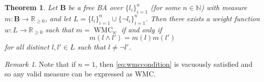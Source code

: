 \documentclass{article}
\newtheorem{theorem}{Theorem}
\theoremstyle{definition}
\theoremstyle{remark}
\newtheorem*{remark}{Remark}
\DeclareMathOperator{\WMC}{WMC}
\begin{document}
\begin{theorem}
  Let $\mathbf{B}$ be a free BA over $\{ l_i \}_{i=1}^n$ (for some $n \in
  \mathbb{N}$) with measure $m\colon \mathbf{B} \to \mathbb{R}_{\ge 0}$, and let
  $L = \{ l_i \}_{i = 1}^n \cup \{ \neg l_i \}_{i = 1}^n$. Then there exists a
  weight function $w\colon L \to \mathbb{R}_{\ge 0}$ such that $m = \WMC_w$ if
  and only if
  \begin{equation} \label{eq:wmccondition}
  m(l \land l') = m(l)m(l')
  \end{equation}
  for all distinct $l, l' \in L$ such that $l \ne \neg l'$.
\end{theorem}

\begin{remark}
  Note that if $n = 1$, then \cref{eq:wmccondition} is vacuously satisfied and
  so any valid measure can be expressed as WMC.
\end{remark}
\end{document}
